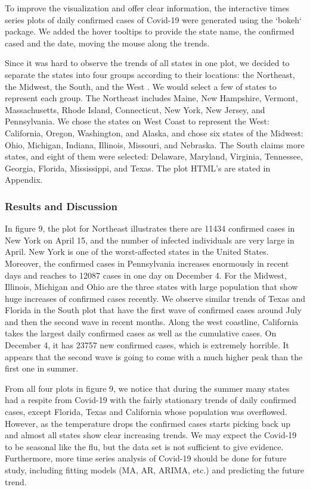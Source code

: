 \documentclass{article}
\begin{document}
To improve the visualization and offer clear information, the interactive times series plots of daily confirmed cases of Covid-19 were generated using the `bokeh` package. We added the hover tooltips to provide the state name, the confirmed cased and the date, moving the mouse along the trends. 


Since it was hard to observe the trends of all states in one plot, we decided to separate the states into four groups according to their locations: the Northeast, the Midwest, the South, and the West \cite{USregion}. We would select a few of states to represent each group. The Northeast includes Maine, New Hampshire, Vermont, Massachusetts, Rhode Island, Connecticut, New York, New Jersey, and Pennsylvania. We chose the states on West Coast to represent the West: California, Oregon, Washington, and Alaska, and chose six states of the Midwest: Ohio, Michigan, Indiana, Illinois, Missouri, and Nebraska. The South claims more states, and eight of them were selected: Delaware, Maryland, Virginia, Tennessee, Georgia, Florida, Mississippi, and Texas. The plot HTML's are stated in Appendix. 



\subsubsection{Results and Discussion}


In figure 9, the plot for Northeast illustrates there are 11434 confirmed cases in New York on April 15, and the number of infected individuals are very large in April. New York is one of the worst-affected states in the United States. Moreover, the confirmed cases in Pennsylvania increases enormously in recent days and reaches to 12087 cases in one day on December 4. For the Midwest, Illinois, Michigan and Ohio are the three states with large population that show huge increases of confirmed cases recently. We observe similar trends of Texas and Florida in the South plot that have the first wave of confirmed cases around July and then the second wave in recent months. Along the west coastline, California takes the largest daily confirmed cases as well as the cumulative cases. On December 4, it has 23757 new confirmed cases, which is extremely horrible. It appears that the second wave is going to come with a much higher peak than the first one in summer. 


From all four plots in figure 9, we notice that during the summer many states had a respite from Covid-19 with the fairly stationary trends of daily confirmed cases, except Florida, Texas and California whose population was overflowed. However, as the temperature drops the confirmed cases starts picking back up and almost all states show clear increasing trends. We may expect the Covid-19 to be seasonal like the flu, but the data set is not sufficient to give evidence. Furthermore, more time series analysis of Covid-19 should be done for future study, including fitting models (MA, AR, ARIMA, etc.) and predicting the future trend. 
\end{document}
